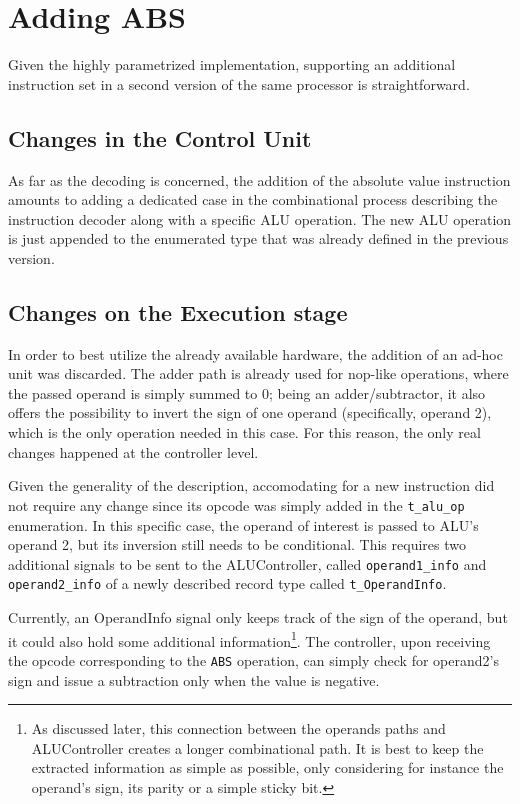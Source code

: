 \section{Adding ABS}
\label{sec:adding-abs}
Given the highly parametrized implementation, supporting an additional instruction set in a second version of the same processor is straightforward.
\subsection{Changes in the Control Unit}
As far as the decoding is concerned, the addition of the absolute value instruction amounts to adding a dedicated case in the combinational process describing the instruction decoder along with a specific ALU operation. The new ALU operation is just appended to the enumerated type that was already defined in the previous version.
\subsection{Changes on the Execution stage}
In order to best utilize the already available hardware, the addition of an ad-hoc unit was discarded. The adder path
is already used for nop-like operations, where the passed operand is simply summed to 0; being an adder/subtractor,
it also offers the possibility to invert the sign of one operand (specifically, operand 2), which is the only operation
needed in this case. For this reason, the only real changes happened at the controller level.

Given the generality of the description, accomodating for a new instruction did not require any change since its opcode
was simply added in the \texttt{t\_alu\_op} enumeration. In this specific case, the operand of interest is passed to
ALU's operand 2, but its inversion still needs to be conditional. This requires two additional signals to be sent to the
ALUController, called \texttt{operand1\_info} and \texttt{operand2\_info} of a newly described record type called
\texttt{t\_OperandInfo}.

Currently, an OperandInfo signal only keeps track of the sign of the operand, but it could also hold some additional
information\footnote{As discussed later, this connection between the operands paths and ALUController creates a longer
combinational path. It is best to keep the extracted information as simple as possible, only considering for instance
the operand's sign, its parity or a simple sticky bit.}. The controller, upon receiving the opcode corresponding to the
\texttt{ABS} operation, can simply check for operand2's sign and issue a subtraction only when the value is negative.

